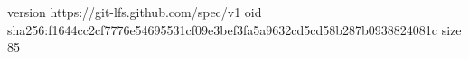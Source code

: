 version https://git-lfs.github.com/spec/v1
oid sha256:f1644cc2cf7776e54695531cf09e3bef3fa5a9632cd5cd58b287b0938824081c
size 85
